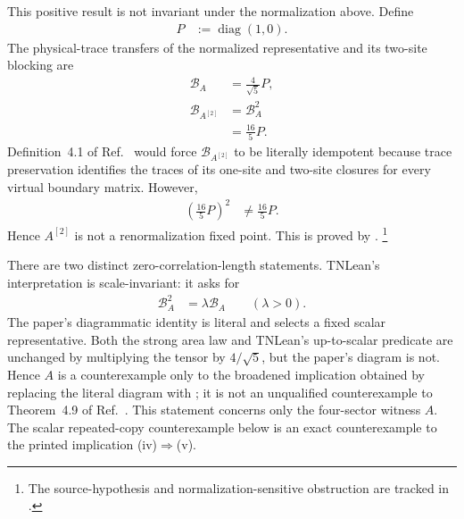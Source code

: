 \documentclass{article}
\begin{document}
This positive result is not invariant under the normalization above. Define
\begin{align}
    P
        &:= \operatorname{diag}(1,0).
    \label{eq:cpgsv17_normalized_coordinate_projection}
\end{align}
The physical-trace transfers of the normalized representative and its
two-site blocking are
\begin{align}
    \mathcal B_A
        &= \frac4{\sqrt5}P,
    \label{eq:cpgsv17_normalized_transfer_projection}\\
    \mathcal B_{A^{[2]}}
        &= \mathcal B_A^2
    \label{eq:cpgsv17_blocked_transfer_square}\\
        &= \frac{16}{5}P.
    \label{eq:cpgsv17_blocked_transfer_projection}
\end{align}
Definition~4.1 of Ref.~\cite{Cirac2016MPDO_arXiv} would force
$\mathcal B_{A^{[2]}}$ to be literally idempotent because trace preservation
identifies the traces of its one-site and two-site closures for every virtual
boundary matrix. However,
\begin{align}
    \left(\frac{16}{5}P\right)^2
        &\neq \frac{16}{5}P.
    \label{eq:cpgsv17_blocked_transfer_nonidempotence}
\end{align}
Hence $A^{[2]}$ is not a renormalization fixed point. This is proved by
.
\footnote{The source-hypothesis and normalization-sensitive obstruction are
tracked in .}

There are two distinct zero-correlation-length statements. TNLean's
 interpretation is scale-invariant: it asks for
\begin{align}
    \mathcal B_A^2
        &= \lambda\mathcal B_A
        \qquad (\lambda>0).
    \label{eq:cpgsv17_scale_invariant_zcl}
\end{align}
The paper's diagrammatic identity is literal and selects a fixed scalar
representative. Both the strong area law and TNLean's up-to-scalar predicate
are unchanged by multiplying the tensor by $4/\sqrt5$, but the paper's diagram
is not. Hence $A$ is a counterexample only to the broadened implication
obtained by replacing the literal diagram with
; it is not an unqualified counterexample to
Theorem~4.9 of Ref.~\cite{Cirac2016MPDO_arXiv}. This statement concerns only
the four-sector witness $A$. The scalar repeated-copy counterexample below is
an exact counterexample to the printed implication (iv)$\Rightarrow$(v).
\end{document}
